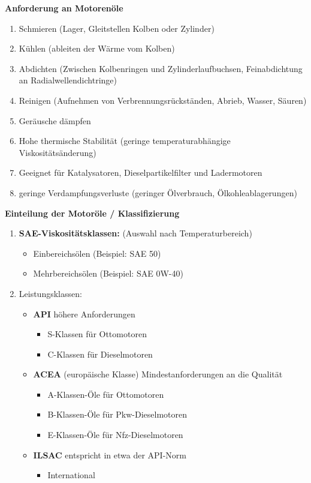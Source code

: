 \textbf{Anforderung an Motorenöle}

\begin{enumerate}
\item
  Schmieren (Lager, Gleitstellen Kolben oder Zylinder)
\item
  Kühlen (ableiten der Wärme vom Kolben)
\item
  Abdichten (Zwischen Kolbenringen und Zylinderlaufbuchsen,
  Feinabdichtung an Radialwellendichtringe)
\item
  Reinigen (Aufnehmen von Verbrennungsrückständen, Abrieb, Wasser,
  Säuren)
\item
  Geräusche dämpfen
\item
  Hohe thermische Stabilität (geringe temperaturabhängige
  Viskositätsänderung)
\item
  Geeignet für Katalysatoren, Dieselpartikelfilter und Ladermotoren
\item
  geringe Verdampfungsverluste (geringer Ölverbrauch,
  Ölkohleablagerungen)
\end{enumerate}

\textbf{Einteilung der Motoröle / Klassifizierung}

\begin{enumerate}
\item
  \textbf{SAE-Viskositätsklassen:} (Auswahl nach Temperaturbereich)

  \begin{itemize}
  \item
    Einbereichsölen (Beispiel: SAE 50)
  \item
    Mehrbereichsölen (Beispiel: SAE 0W-40)
  \end{itemize}
\item
  Leistungsklassen:

  \begin{itemize}
  \item
    \textbf{API} höhere Anforderungen

    \begin{itemize}
    \item
      S-Klassen für Ottomotoren
    \item
      C-Klassen für Dieselmotoren
    \end{itemize}
  \item
    \textbf{ACEA} (europäische Klasse) Mindestanforderungen an die
    Qualität

    \begin{itemize}
    \item
      A-Klassen-Öle für Ottomotoren
    \item
      B-Klassen-Öle für Pkw-Dieselmotoren
    \item
      E-Klassen-Öle für Nfz-Dieselmotoren
    \end{itemize}
  \item
    \textbf{ILSAC} entspricht in etwa der API-Norm

    \begin{itemize}
    \item
      International
    \end{itemize}
  \end{itemize}
\end{enumerate}

